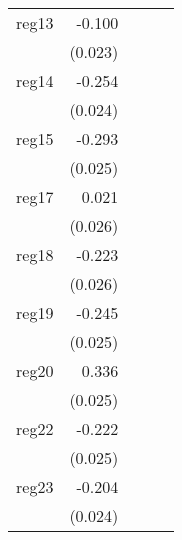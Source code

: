 {\begin{longtable}{l*{4}{D{.}{.}{-1}}}
\addlinespace
reg13       &      -0.100\sym{***}&                     &                     &                     \\
            &     (0.023)         &                     &                     &                     \\
\addlinespace
reg14       &      -0.254\sym{***}&                     &                     &                     \\
            &     (0.024)         &                     &                     &                     \\
\addlinespace
reg15       &      -0.293\sym{***}&                     &                     &                     \\
            &     (0.025)         &                     &                     &                     \\
\addlinespace
reg17       &       0.021         &                     &                     &                     \\
            &     (0.026)         &                     &                     &                     \\
\addlinespace
reg18       &      -0.223\sym{***}&                     &                     &                     \\
            &     (0.026)         &                     &                     &                     \\
\addlinespace
reg19       &      -0.245\sym{***}&                     &                     &                     \\
            &     (0.025)         &                     &                     &                     \\
\addlinespace
reg20       &       0.336\sym{***}&                     &                     &                     \\
            &     (0.025)         &                     &                     &                     \\
\addlinespace
reg22       &      -0.222\sym{***}&                     &                     &                     \\
            &     (0.025)         &                     &                     &                     \\
\addlinespace
reg23       &      -0.204\sym{***}&                     &                     &                     \\
            &     (0.024)         &                     &                     &                     \\

\end{longtable}}

